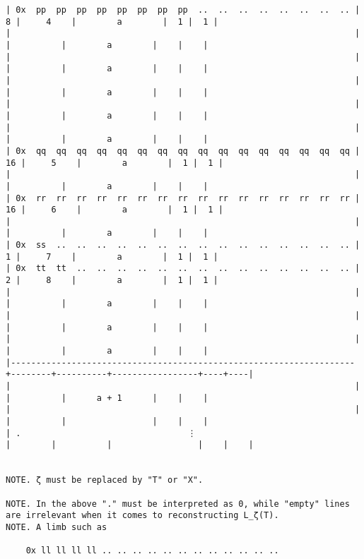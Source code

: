 \documentclass[varwidth=\maxdimen,margin=0.5cm,multi={verbatim}]{standalone}
\begin{document}
\begin{verbatim}
| 0x  pp  pp  pp  pp  pp  pp  pp  pp  ..  ..  ..  ..  ..  ..  ..  .. |      8 |     4    |        a        |  1 |  1 |
|                                                                    |        |          |        a        |    |    |
|                                                                    |        |          |        a        |    |    |
|                                                                    |        |          |        a        |    |    |
|                                                                    |        |          |        a        |    |    |
|                                                                    |        |          |        a        |    |    |
| 0x  qq  qq  qq  qq  qq  qq  qq  qq  qq  qq  qq  qq  qq  qq  qq  qq |     16 |     5    |        a        |  1 |  1 |
|                                                                    |        |          |        a        |    |    |
| 0x  rr  rr  rr  rr  rr  rr  rr  rr  rr  rr  rr  rr  rr  rr  rr  rr |     16 |     6    |        a        |  1 |  1 |
|                                                                    |        |          |        a        |    |    |
| 0x  ss  ..  ..  ..  ..  ..  ..  ..  ..  ..  ..  ..  ..  ..  ..  .. |      1 |     7    |        a        |  1 |  1 |
| 0x  tt  tt  ..  ..  ..  ..  ..  ..  ..  ..  ..  ..  ..  ..  ..  .. |      2 |     8    |        a        |  1 |  1 |
|                                                                    |        |          |        a        |    |    |
|                                                                    |        |          |        a        |    |    |
|                                                                    |        |          |        a        |    |    |
|--------------------------------------------------------------------+--------+----------+-----------------+----+----|
|                                                                    |        |          |      a + 1      |    |    |
|                                                                    |        |          |                 |    |    |
| .                                 ⋮                                |        |          |                 |    |    |


NOTE. ζ must be replaced by "T" or "X".

NOTE. In the above "." must be interpreted as 0, while "empty" lines are irrelevant when it comes to reconstructing L_ζ(T).
NOTE. A limb such as

    0x ll ll ll ll .. .. .. .. .. .. .. .. .. .. .. ..


\end{verbatim}
\end{document}
